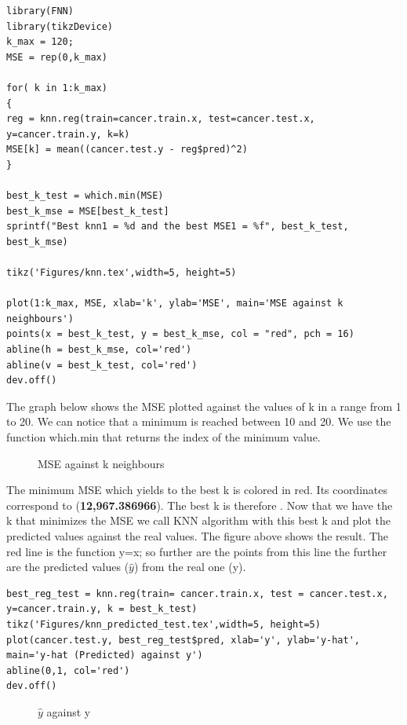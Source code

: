 \documentclass[]{report}
\begin{document}
\begin{lstlisting}
library(FNN)
library(tikzDevice)
k_max = 120;
MSE = rep(0,k_max)

for( k in 1:k_max)
{
reg = knn.reg(train=cancer.train.x, test=cancer.test.x, y=cancer.train.y, k=k)
MSE[k] = mean((cancer.test.y - reg$pred)^2)
}

best_k_test = which.min(MSE)
best_k_mse = MSE[best_k_test]
sprintf("Best knn1 = %d and the best MSE1 = %f", best_k_test, best_k_mse)

tikz('Figures/knn.tex',width=5, height=5)

plot(1:k_max, MSE, xlab='k', ylab='MSE', main='MSE against k neighbours')
points(x = best_k_test, y = best_k_mse, col = "red", pch = 16)
abline(h = best_k_mse, col='red')
abline(v = best_k_test, col='red')
dev.off()
\end{lstlisting}

The graph below shows the MSE plotted against the values of k in a range from 1 to 20. We can notice that a minimum is reached between 10 and 20. We use the function which.min that returns the index of the minimum value.\\
	
\begin{figure}[!hb]
	\centering
	
	\caption{MSE against k neighbours}
\end{figure}

 The minimum MSE which yields to the best k is colored in red. Its coordinates correspond to (\textbf{12,967.386966}). The best k is therefore .
Now that we have the k that minimizes the MSE we call KNN algorithm with this best k and plot the predicted values against the real values. The figure above shows the result. The red line is the function y=x; so further are the points from this line the further are the predicted values ($\hat{y}$) from the real one (y).

\begin{lstlisting}
best_reg_test = knn.reg(train= cancer.train.x, test = cancer.test.x, y=cancer.train.y, k = best_k_test)
tikz('Figures/knn_predicted_test.tex',width=5, height=5)
plot(cancer.test.y, best_reg_test$pred, xlab='y', ylab='y-hat', main='y-hat (Predicted) against y')
abline(0,1, col='red')
dev.off() 
\end{lstlisting}

\begin{figure}[!h]
	\centering
	
	\caption{$\hat{y}$ against y}
\end{figure}
\end{document}

